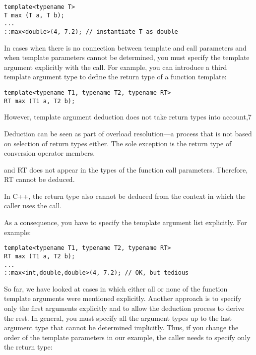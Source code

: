 \begin{lstlisting}[style=styleCXX]
template<typename T>
T max (T a, T b);
...
::max<double>(4, 7.2); // instantiate T as double
\end{lstlisting}

In cases when there is no connection between template and call parameters and when template parameters cannot be determined, you must specify the template argument explicitly with the call. For example, you can introduce a third template argument type to define the return type of a function template:

\begin{lstlisting}[style=styleCXX]
template<typename T1, typename T2, typename RT>
RT max (T1 a, T2 b);
\end{lstlisting}

However, template argument deduction does not take return types into account,7 

\begin{tcolorbox}[colback=webgreen!5!white,colframe=webgreen!75!black]
\hspace*{0.75cm}Deduction can be seen as part of overload resolution—a process that is not based on selection of return types either. The sole exception is the return type of conversion operator members.
\end{tcolorbox}

and RT does not appear in the types of the function call parameters. Therefore, RT cannot be deduced.

\begin{tcolorbox}[colback=webgreen!5!white,colframe=webgreen!75!black]
\hspace*{0.75cm}In C++, the return type also cannot be deduced from the context in which the caller uses the call.
\end{tcolorbox}

As a consequence, you have to specify the template argument list explicitly. For example:

\begin{lstlisting}[style=styleCXX]
template<typename T1, typename T2, typename RT>
RT max (T1 a, T2 b);
...
::max<int,double,double>(4, 7.2); // OK, but tedious
\end{lstlisting}

So far, we have looked at cases in which either all or none of the function template arguments were mentioned explicitly. Another approach is to specify only the first arguments explicitly and to allow the deduction process to derive the rest. In general, you must specify all the argument types up to the last argument type that cannot be determined implicitly. Thus, if you change the order of the template parameters in our example, the caller needs to specify only the return type:

